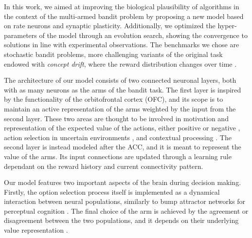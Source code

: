 \hfill \break
\indent In this work, we aimed at improving the biological plausibility of algorithms in the context of the multi-armed bandit problem by proposing a new model based on rate neurons and synaptic plasticity.
Additionally, we optimized the hyper-parameters of the model through an evolution search, showing the convergence to solutions in line with experimental observations.
The benchmarks we chose are stochastic bandit problems, more challenging variants of the original task endowed with \textit{concept drift}, where the reward distribution changes over time \cite{garivierUpperConfidenceBoundPolicies2008, besbesStochasticMultiArmedBanditProblem2014, cavenaghiNonStationaryMultiArmed2021}.

The architecture of our model consists of two connected neuronal layers, both with as many neurons as the arms of the bandit task.
The first layer is inspired by the functionality of the orbitofrontal cortex (OFC), and its scope is to maintain an active representation of the arms weighted by the input from the second layer. These two areas are thought to be involved in motivation and representation of the expected value of the actions, either positive or negative \cite{odohertyAbstractRewardPunishment2001, ricebergRewardStabilityDetermines2012, tremblayRelativeRewardPreference1999}, action selection in uncertain environments \cite{elliottDissociableFunctionsMedial2000}, and contextual processing \cite{frankAnatomyDecisionStriatoorbitofrontal2006}.
The second layer is instead modeled after the ACC, and it is meant to represent the value of the arms. Its input connections are updated through a learning rule dependant on the reward history and current connectivity pattern.

Our model features two important aspects of the brain during decision making. Firstly, the option selection process itself is implemented as a dynamical interaction between neural populations, similarly to bump attractor networks for perceptual cognition \cite{carrollEncodingCertaintyBump2014, esnaola-acebesBumpAttractorDynamics2021}.
The final choice of the arm is achieved by the agreement or disagreement between the two populations, and it depends on their underlying value representation \cite{bariDynamicDecisionMaking2021, houstonMatchingBehavioursRewards2021}.

